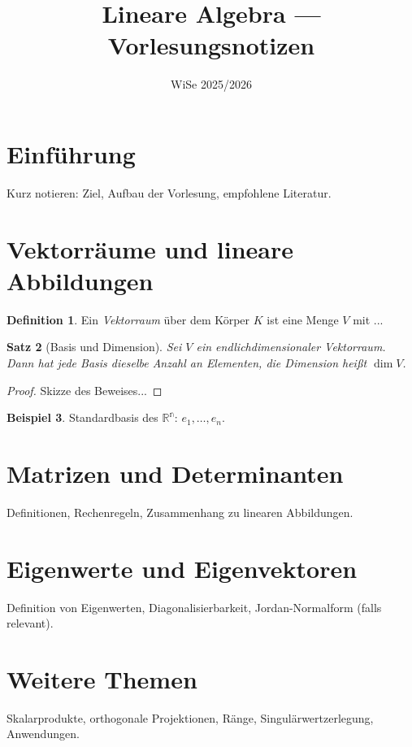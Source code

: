 \documentclass[a4paper,11pt,oneside]{scrartcl}
\title{Lineare Algebra --- Vorlesungsnotizen}
\date{WiSe 2025/2026}
\theoremstyle{plain}
\newtheorem{satz}{Satz}[section]
\theoremstyle{definition}
\newtheorem{definition}[satz]{Definition}
\newtheorem{beispiel}[satz]{Beispiel}
\begin{document}
\maketitle
\newpage
{}
\setcounter{page}{1}
\tableofcontents
\newpage
\bigskip
{}
\setcounter{page}{1}

\section{Einführung}
Kurz notieren: Ziel, Aufbau der Vorlesung, empfohlene Literatur.

\section{Vektorräume und lineare Abbildungen}
\begin{definition}
Ein \emph{Vektorraum} über dem Körper \(K\) ist eine Menge \(V\) mit ...
\end{definition}

\begin{satz}[Basis und Dimension]
Sei \(V\) ein endlichdimensionaler Vektorraum. Dann hat jede Basis dieselbe Anzahl an Elementen, die Dimension heißt \(\dim V\).
\end{satz}

\begin{proof}
Skizze des Beweises...
\end{proof}

\begin{beispiel}
Standardbasis des $\mathbb{R^n}$: $e_1,\dots,e_n$.
\end{beispiel}

\section{Matrizen und Determinanten}
Definitionen, Rechenregeln, Zusammenhang zu linearen Abbildungen.

\section{Eigenwerte und Eigenvektoren}
Definition von Eigenwerten, Diagonalisierbarkeit, Jordan-Normalform (falls relevant).

\section{Weitere Themen}
Skalarprodukte, orthogonale Projektionen, Ränge, Singulärwertzerlegung, Anwendungen.

\end{document}

